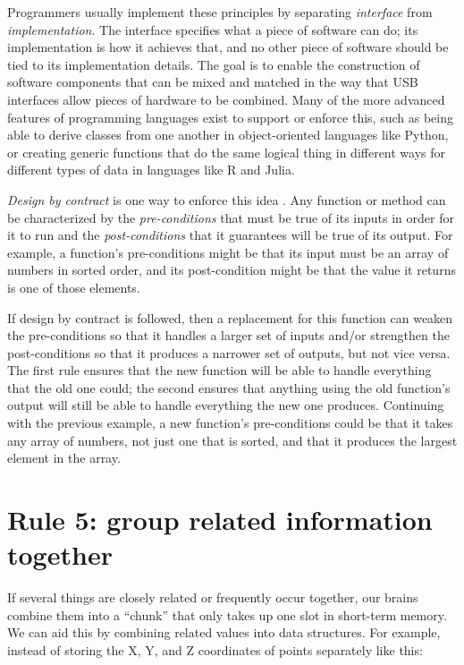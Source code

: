\documentclass[10pt,letterpaper]{article}
\begin{document}
Programmers usually implement these principles
by separating \emph{interface} from \emph{implementation}.
The interface specifies what a piece of software can do;
its implementation is how it achieves that,
and no other piece of software should be tied to its implementation details.
The goal is to enable the construction of software components
that can be mixed and matched in the way that USB interfaces allow pieces of hardware to be combined.
Many of the more advanced features of programming languages exist to support or enforce this,
such as being able to derive classes from one another in object-oriented languages like Python,
or creating generic functions that do the same logical thing in different ways for different types of data in languages like R and Julia.

\emph{Design by contract} is one way to enforce this idea \cite{Meyer1994}.
Any function or method can be characterized by
the \emph{pre-conditions} that must be true of its inputs in order for it to run
and the \emph{post-conditions} that it guarantees will be true of its output.
For example,
a function's pre-conditions might be that its input must be
an array of numbers in sorted order,
and its post-condition might be that
the value it returns is one of those elements.

If design by contract is followed,
then a replacement for this function can weaken the pre-conditions
so that it handles a larger set of inputs
and/or strengthen the post-conditions
so that it produces a narrower set of outputs,
but not vice versa.
The first rule ensures that the new function will be able to handle
everything that the old one could;
the second ensures that anything using the old function's output
will still be able to handle everything the new one produces.
Continuing with the previous example,
a new function's pre-conditions could be that it takes any array of numbers,
not just one that is sorted,
and that it produces the largest element in the array.

\section*{Rule 5: group related information together}

If several things are closely related or frequently occur together,
our brains combine them into a ``chunk''
that only takes up one slot in short-term memory.
We can aid this by combining related values into data structures.
For example,
instead of storing the X, Y, and Z coordinates of points separately like this:
\end{document}
